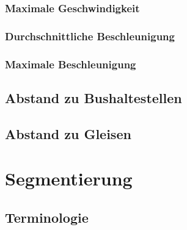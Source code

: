 \subsubsection{Maximale Geschwindigkeit}
\subsubsection{Durchschnittliche Beschleunigung}
\subsubsection{Maximale Beschleunigung}
\subsection{Abstand zu Bushaltestellen}
\subsection{Abstand zu Gleisen}
\clearpage

\section{Segmentierung}
\subsection{Terminologie}
